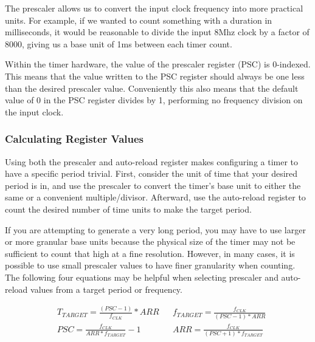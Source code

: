 \documentclass[11pt,fleqn]{book} %
\begin{document}
        The prescaler allows us to convert the input clock frequency into more practical units. For example, if we wanted to count something with a duration in milliseconds, it would be reasonable to divide the input 8Mhz clock by a factor of 8000, giving us a base unit of 1ms between each timer count. 
        
        Within the timer hardware, the value of the prescaler register (PSC) is 0-indexed. This means that the value written to the PSC register should always be one less than the desired prescaler value. Conveniently this also means that the default value of 0 in the PSC register divides by 1, performing no frequency division on the input clock.  

    \subsubsection{Calculating Register Values}
        Using both the prescaler and auto-reload register makes configuring a timer to have a specific period trivial. First, consider the unit of time that your desired period is in, and use the prescaler to convert the timer's base unit to either the same or a convenient multiple/divisor. Afterward, use the auto-reload register to count the desired number of time units to make the target period. 
        
        If you are attempting to generate a very long period, you may have to use larger or more granular base units because the physical size of the timer may not be sufficient to count that high at a fine resolution. However, in many cases, it is possible to use small prescaler values to have finer granularity when counting.
        The following four equations may be helpful when selecting prescaler and auto-reload values from a target period or frequency. 
        
        \begin{align*}
            & T_{TARGET} = \frac{(PSC-1)}{f_{CLK}} * ARR & & f_{TARGET} = \frac{f_{CLK}}{(PSC-1) * ARR}\\[1em]
            & PSC = \frac{f_{CLK}}{ARR * f_{TARGET}}-1 & & ARR = \frac{f_{CLK}}{(PSC+1) * f_{TARGET}}
        \end{align*}
        	
\end{document}
